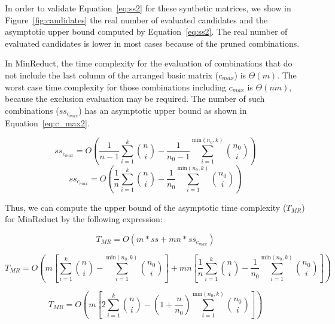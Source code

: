 \documentclass[citenumber]{llncs}
\begin{document}
	In order to validate Equation~\ref{eq:ss2} for these synthetic matrices, we show in Figure~\ref{fig:candidates} the real number of evaluated candidates and the asymptotic upper bound computed by Equation~\ref{eq:ss2}. The real number of evaluated candidates is lower in most cases because of the pruned combinations.
	
	In MinReduct, the time complexity for the evaluation of combinations that do not include the last column of the arranged basic matrix ($c_{max}$) is $\Theta(m)$. The worst case time complexity for those combinations including $c_{max}$ is $\Theta(nm)$, because the exclusion evaluation may be required. The number of such combinations ($ss_{c_{max}}$) has an asymptotic upper bound as shown in Equation~\ref{eq:c_max2}.
	
	\begin{equation*}
	ss_{c_{max}}= O\left(\frac{1}{n-1}\sum_{i=1}^{k} \binom{n}{i} - \frac{1}{n_0-1}\sum_{i=1}^{\mathrm{min}(n_0,k)} \binom{n_0}{i}\right)\label{eq:c_max1}
	\end{equation*}
	\begin{equation}
	ss_{c_{max}}= O\left(\frac{1}{n}\sum_{i=1}^{k} \binom{n}{i} - \frac{1}{n_0}\sum_{i=1}^{\mathrm{min}(n_0,k)} \binom{n_0}{i}\right)\label{eq:c_max2}
	\end{equation}
	
	Thus, we can compute the upper bound of the asymptotic time complexity ($T_{MR}$) for MinReduct by the following expression:
	
	\begin{equation}
	T_{MR} = O\left(m*ss + mn*ss_{c_{max}}\label{eq:T1}\right)
	\end{equation}
	
	\begin{equation*}
	T_{MR} = O\left(m\left[\sum_{i=1}^{k} \binom{n}{i} - \sum_{i=1}^{\mathrm{min}(n_0,k)} \binom{n_0}{i}\right]+mn\left[\frac{1}{n}\sum_{i=1}^{k} \binom{n}{i} - \frac{1}{n_0}\sum_{i=1}^{\mathrm{min}(n_0,k)} \binom{n_0}{i}\right]\right)
	\end{equation*}	
	
	\begin{equation}
	T_{MR} = O\left(m\left[2\sum_{i=1}^{k} \binom{n}{i} - \left(1 + \frac{n}{n_0}\right)\sum_{i=1}^{\mathrm{min}(n_0,k)} \binom{n_0}{i}\right]\right)\label{eq:T2}
	\end{equation}	
	
	
\end{document}
